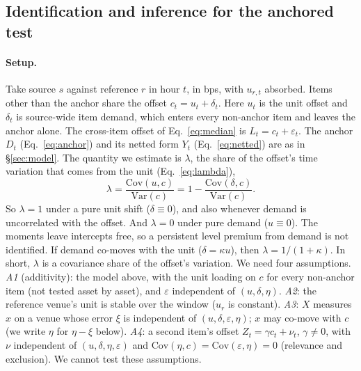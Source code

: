 \subsection{Identification and inference for the anchored test}
\label{sec:anchored-theory}

\paragraph{Setup.} Take source $s$ against reference $r$ in hour $t$, in bps, with $u_{r,t}$ absorbed. Items other than the
anchor share the offset $c_t=u_t+\delta_t$. Here $u_t$ is the unit offset and $\delta_t$ is source-wide item demand, which
enters every non-anchor item and leaves the anchor alone. The cross-item offset of Eq.~\eqref{eq:median} is
$L_t=c_t+\varepsilon_t$. The anchor $D_t$ (Eq.~\eqref{eq:anchor}) and its netted form $Y_t$ (Eq.~\eqref{eq:netted}) are
as in \S\ref{sec:model}. The quantity we estimate is $\lambda$, the share of the offset's time variation that comes from the
unit (Eq.~\eqref{eq:lambda}),
\begin{equation}
\lambda=\frac{\mathrm{Cov}(u,c)}{\mathrm{Var}(c)}=1-\frac{\mathrm{Cov}(\delta,c)}{\mathrm{Var}(c)}.
\label{eq:lambda}
\end{equation}
So $\lambda=1$ under a pure unit shift ($\delta\equiv0$), and also whenever demand is uncorrelated with the offset. And
$\lambda=0$ under pure demand ($u\equiv0$). The moments leave intercepts free, so a persistent level premium from demand is
not identified. If demand co-moves with the unit ($\delta=\kappa u$), then $\lambda=1/(1+\kappa)$. In short, $\lambda$ is a
covariance share of the offset's variation. We need four assumptions. \emph{A1} (additivity): the model above, with the unit loading on $c$ for every non-anchor item
(not tested asset by asset), and $\varepsilon$ independent of $(u,\delta,\eta)$.
\emph{A2}: the reference venue's unit is stable over the window ($u_r$ is constant).
\emph{A3}: $X$ measures $x$ on a venue whose error $\xi$ is independent of $(u,\delta,\varepsilon,\eta)$; $x$ may co-move with $c$ (we write $\eta$ for $\eta-\xi$ below).
\emph{A4}: a second item's offset $Z_t=\gamma c_t+\nu_t$, $\gamma\neq0$, with $\nu$ independent of $(u,\delta,\eta,\varepsilon)$ and
$\mathrm{Cov}(\eta,c)=\mathrm{Cov}(\varepsilon,\eta)=0$ (relevance and exclusion). We cannot test these assumptions.

